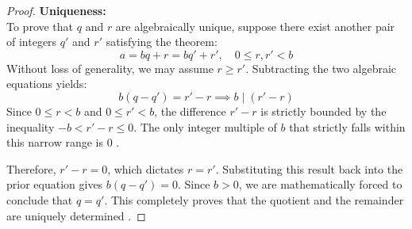 \documentclass[11pt]{article}
\theoremstyle{definition}
\theoremstyle{plain}
\theoremstyle{remark}
\begin{document}
\begin{proof}
\vspace{0.3cm}
\textbf{Uniqueness:} \\
To prove that $q$ and $r$ are algebraically unique, suppose there exist another pair of integers $q'$ and $r'$ satisfying the theorem:
\begin{equation}
    a = bq + r = bq' + r', \quad 0 \le r, r' < b
\end{equation}
Without loss of generality, we may assume $r \ge r'$. Subtracting the two algebraic equations yields:
\begin{equation}
    b(q - q') = r' - r \implies b \mid (r' - r)
\end{equation}
Since $0 \le r < b$ and $0 \le r' < b$, the difference $r' - r$ is strictly bounded by the inequality $-b < r' - r \le 0$. The only integer multiple of $b$ that strictly falls within this narrow range is $0$ \cite{dummit}. 

Therefore, $r' - r = 0$, which dictates $r = r'$. Substituting this result back into the prior equation gives $b(q - q') = 0$. Since $b > 0$, we are mathematically forced to conclude that $q = q'$. This completely proves that the quotient and the remainder are uniquely determined \cite{gallian}.
\end{proof}










\end{document}

